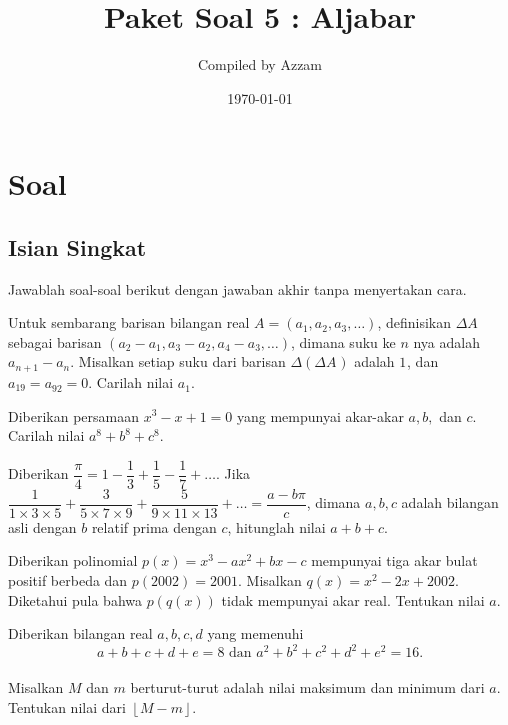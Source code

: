 \documentclass[12pt]{scrartcl}
\begin{document}
	\title{Paket Soal 5 : Aljabar} %
	\date{\today}
	\author{Compiled by Azzam}
	\maketitle

\renewcommand*\contentsname{Daftar Isi}
\tableofcontents

\newpage
	\newpage
	
	\section{Soal}
\subsection{Isian Singkat}
Jawablah soal-soal berikut dengan jawaban akhir tanpa menyertakan cara.

	\begin{soalbaru}
		Untuk sembarang barisan bilangan real $A=(a_1,a_2,a_3,\ldots)$, definisikan $\Delta A^{}_{}$ sebagai barisan $(a_2-a_1,a_3-a_2,a_4-a_3,\ldots)$, dimana suku ke $n$ nya adalah  $a_{n+1}-a_n^{}$. Misalkan setiap suku dari barisan  $\Delta(\Delta A^{}_{})$ adalah $1^{}_{}$, dan $a_{19}=a_{92}^{}=0$. Carilah nilai $a_1^{}$.
	\end{soalbaru}
	
	\begin{soalbaru}
		Diberikan persamaan $x^3-x+1=0$ yang mempunyai akar-akar $a,b,$ dan $c$. Carilah nilai $a^8+b^8+c^8$.
	\end{soalbaru}
	
	\begin{soalbaru}
			Diberikan $\dfrac{\pi}{4} = 1 - \dfrac{1}{3}+\dfrac{1}{5}-\dfrac{1}{7}+\dots$. Jika  $\dfrac{1}{1 \times 3 \times 5}+\dfrac{3}{5 \times 7 \times 9}+\dfrac{5}{9 \times 11 \times 13}+\dots = \dfrac{a-b\pi}{c}$, dimana $a,b,c$ adalah bilangan asli dengan $b$ relatif prima dengan $c$, hitunglah nilai $a+b+c$.
		\end{soalbaru}
	
	\begin{soalbaru}
		Diberikan polinomial $p(x)=x^3-ax^2+bx-c$ mempunyai tiga akar bulat positif berbeda dan $p(2002)=2001$. Misalkan $q(x)=x^2-2x+2002$. Diketahui pula bahwa $p(q(x))$ tidak mempunyai akar real. Tentukan nilai $a$.
	\end{soalbaru}
	
	\begin{soalbaru}
		Diberikan bilangan real $a,b,c,d$ yang memenuhi\\[-20pt] $$a+b+c+d+e=8 \text{ dan }a^2+b^2+c^2+d^2+e^2=16.$$\\[-25pt] Misalkan $M$ dan $m$ berturut-turut adalah nilai maksimum dan minimum dari $a$. Tentukan nilai dari $\left \lfloor M-m \right \rfloor$.  %
	\end{soalbaru}
	
\end{document}
